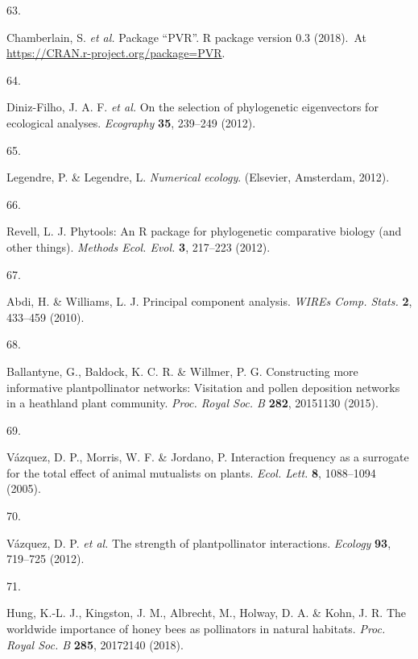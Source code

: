 \documentclass[
  12pt,
  a4paper,
]{article}
\newlength{\cslhangindent}
\newlength{\csllabelwidth}
\newlength{\cslentryspacingunit} %
\newenvironment{CSLReferences}[2] %
 {%
  \setlength{\parindent}{0pt}
  \ifodd #1
  \let\oldpar\par
  \def\par{\hangindent=\cslhangindent\oldpar}
  \fi
  \setlength{\parskip}{#2\cslentryspacingunit}
 }%
 {}
\newcommand{\CSLLeftMargin}[1]{\parbox[t]{\csllabelwidth}{#1}}
\newcommand{\CSLRightInline}[1]{\parbox[t]{\linewidth - \csllabelwidth}{#1}\break}
\begin{document}
\begin{CSLReferences}{0}{0}
\leavevmode{}%
\CSLLeftMargin{63. }
\CSLRightInline{Chamberlain, S. \emph{et al.} Package {``{PVR}''}. R package version 0.3 (2018).~At \href{https://CRAN.R-project.org/package=PVR}{https://CRAN.r-project.org/package=PVR}.}

\leavevmode{}%
\CSLLeftMargin{64. }
\CSLRightInline{Diniz-Filho, J. A. F. \emph{et al.} On the selection of phylogenetic eigenvectors for ecological analyses. \emph{Ecography} \textbf{35}, 239--249 (2012).}

\leavevmode{}%
\CSLLeftMargin{65. }
\CSLRightInline{Legendre, P. \& Legendre, L. \emph{Numerical ecology}. ({Elsevier, Amsterdam}, 2012).}

\leavevmode{}%
\CSLLeftMargin{66. }
\CSLRightInline{Revell, L. J. Phytools: An {R} package for phylogenetic comparative biology (and other things). \emph{Methods Ecol. Evol.} \textbf{3}, 217--223 (2012).}

\leavevmode{}%
\CSLLeftMargin{67. }
\CSLRightInline{Abdi, H. \& Williams, L. J. Principal component analysis. \emph{WIREs Comp. Stats.} \textbf{2}, 433--459 (2010).}

\leavevmode{}%
\CSLLeftMargin{68. }
\CSLRightInline{Ballantyne, G., Baldock, K. C. R. \& Willmer, P. G. Constructing more informative plant\textendash pollinator networks: Visitation and pollen deposition networks in a heathland plant community. \emph{Proc. Royal Soc. B} \textbf{282}, 20151130 (2015).}

\leavevmode{}%
\CSLLeftMargin{69. }
\CSLRightInline{Vázquez, D. P., Morris, W. F. \& Jordano, P. Interaction frequency as a surrogate for the total effect of animal mutualists on plants. \emph{Ecol. Lett.} \textbf{8}, 1088--1094 (2005).}

\leavevmode{}%
\CSLLeftMargin{70. }
\CSLRightInline{Vázquez, D. P. \emph{et al.} The strength of plant\textendash pollinator interactions. \emph{Ecology} \textbf{93}, 719--725 (2012).}

\leavevmode{}%
\CSLLeftMargin{71. }
\CSLRightInline{Hung, K.-L. J., Kingston, J. M., Albrecht, M., Holway, D. A. \& Kohn, J. R. The worldwide importance of honey bees as pollinators in natural habitats. \emph{Proc. Royal Soc. B} \textbf{285}, 20172140 (2018).}


\end{CSLReferences}
\end{document}
